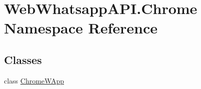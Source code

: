 \hypertarget{namespace_web_whatsapp_a_p_i_1_1_chrome}{}\section{Web\+Whatsapp\+A\+P\+I.\+Chrome Namespace Reference}
\label{namespace_web_whatsapp_a_p_i_1_1_chrome}
\subsection*{Classes}
\begin{DoxyCompactItemize}
\item 
class \hyperlink{class_web_whatsapp_a_p_i_1_1_chrome_1_1_chrome_w_app}{Chrome\+W\+App}
\end{DoxyCompactItemize}
